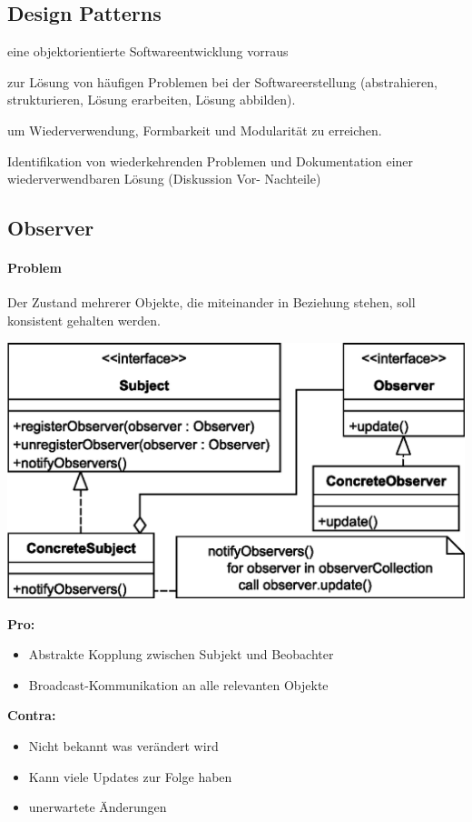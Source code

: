 \documentclass[a4paper,fontsize=9pt, DIV=calc]{scrartcl}
\begin{document}
\begin{multicols}{2}
\begin{multicols}{2}

\section{Design Patterns}
\begin{description}[leftmargin=*]\itemsep-2mm
\item[Setzen] eine objektorientierte Softwareentwicklung vorraus
\item[Regeln] zur Lösung von häufigen Problemen bei der Softwareerstellung (abstrahieren, strukturieren, Lösung erarbeiten, Lösung abbilden).
\item[Katalysatoren] um Wiederverwendung, Formbarkeit und Modularität zu erreichen.
\item[Nutzen] Identifikation von wiederkehrenden Problemen und Dokumentation einer wiederverwendbaren Lösung (Diskussion Vor- Nachteile)
\end{description}
\end{multicols}
\subsection{Observer}
\paragraph*{Problem} Der Zustand mehrerer Objekte, die miteinander in Beziehung stehen, soll konsistent gehalten werden.
\begin{center}
\includegraphics[width=0.85\columnwidth]{src/observer}
\end{center}


\begin{multicols}{2}
\textbf{Pro:}
\begin{itemize}[leftmargin=*]\itemsep-2mm
	\item Abstrakte Kopplung zwischen Subjekt und Beobachter
	\item Broadcast-Kommunikation an alle relevanten Objekte
\end{itemize}
\textbf{Contra:}
\begin{itemize}[leftmargin=*]\itemsep-2mm
	\item Nicht bekannt was verändert wird
	\item Kann viele Updates zur Folge haben
	\item unerwartete Änderungen
 \end{itemize}
		

\end{multicols}
\end{multicols}
\end{document}
